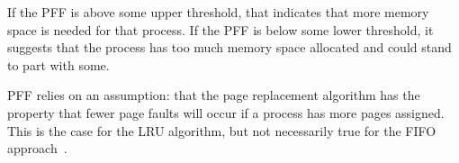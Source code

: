 If the PFF is above some upper threshold, that indicates that more memory space is needed for that process. If the PFF is below some lower threshold, it suggests that the process has too much memory space allocated and could stand to part with some.

PFF relies on an assumption: that the page replacement algorithm has the property that fewer page faults will occur if a process has more pages assigned. This is the case for the LRU algorithm, but not necessarily true for the FIFO approach~\cite{mte241}.





